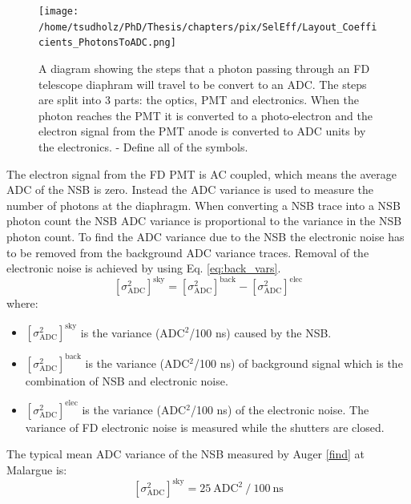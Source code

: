 \begin{figure}
\centering
\texttt{[image: /home/tsudholz/PhD/Thesis/chapters/pix/SelEff/Layout\_Coefficients\_PhotonsToADC.png]}
\caption{A diagram showing the steps that a photon passing through an FD telescope diaphram will travel to be convert to an ADC. The steps are split into 3 parts: the optics, PMT and electronics. When the photon reaches the PMT it is converted to a photo-electron and the electron signal from the PMT anode is converted to ADC units by the electronics.
- Define all of the symbols.} \label{fig:FD_CoefficientLayout_PhotonToADC}
\end{figure}
  
The electron signal from the FD PMT is AC coupled, which means the average ADC of the NSB is zero. Instead the ADC variance is used to measure the number of photons at the diaphragm. When converting a NSB trace into a NSB photon count the NSB ADC variance is proportional to the variance in the NSB photon count. To find the ADC variance due to the NSB the electronic noise has to be removed from the background ADC variance traces. Removal of the electronic noise is achieved by using Eq. \ref{eq:back_vars}. 
\begin{equation}
\left[\sigma^2_{\mathrm{ADC}}\right]^{\mathrm{sky}} = \left[\sigma^2_{\mathrm{ADC}}\right]^{\mathrm{back}} - \left[\sigma^2_{\mathrm{ADC}}\right]^{\mathrm{elec}} \label{eq:back_vars}
\end{equation} 
where:
\begin{itemize}
\item[] $\left[\sigma^2_{\mathrm{ADC}}\right]^{\mathrm{sky}}$ is the variance (ADC$^2$/100 ns) caused by the NSB.
\item[] $\left[\sigma^2_{\mathrm{ADC}}\right]^{\mathrm{back}}$ is the variance (ADC$^2$/100 ns) of background signal which is the combination of NSB and electronic noise.
\item[] $\left[\sigma^2_{\mathrm{ADC}}\right]^{\mathrm{elec}}$ is the variance (ADC$^2$/100 ns) of the electronic noise. The variance of FD electronic noise is measured while the shutters are closed.
\end{itemize}
The typical mean ADC variance of the NSB measured by Auger \ref{find} at Malargue is:
\begin{equation}
\left[\sigma^2_{\mathrm{ADC}}\right]^{\mathrm{sky}} = 25 \ \mathrm{ADC}^2 \ / \ 100 \ \mathrm{ns} \nonumber
\end{equation}


